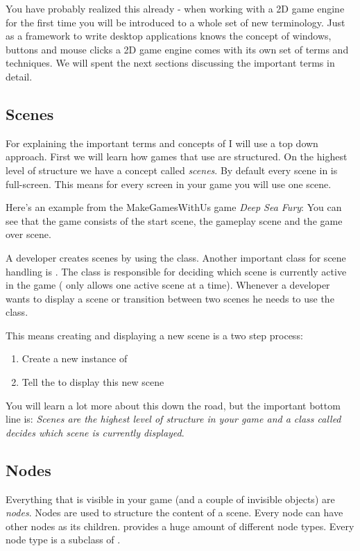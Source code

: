 You have probably realized this already - when working with a 2D game engine for
the first time you will be introduced to a whole set of new terminology. Just as a framework to write desktop
applications knows the concept of windows, buttons and mouse clicks a 2D game
engine comes with its own set of terms and techniques. We will spent the next
sections discussing the important terms in detail.

\subsection{Scenes}
For explaining the important terms and concepts of \cocos{} I will use a top
down approach. First we will learn how games that use \cocos{} are structured.
On the highest level of structure we have a concept called \textit{scenes}. By default every scene in
\cocos{} is full-screen. This means for every screen in your game you will use
one scene.

Here's an example from the MakeGamesWithUs game \textit{Deep Sea Fury}:
You can see that the game consists of the start scene, the gameplay scene and
the game over scene.

A \cocos{} developer creates scenes by using the \ccscene{} class. Another
important \cocos{} class for scene handling is \ccdirector{}. The \ccdirector{}
class is responsible for deciding which scene is currently active in the game
(\cocos{} only allows one active scene at a time). Whenever a developer wants to
display a scene or transition between two scenes he needs to use the
\ccdirector{} class.

This means creating and displaying a new scene is a two step process:
\begin{enumerate}
\item Create a new instance of \ccscene{}
\item Tell the \ccdirector{} to display this new scene
\end{enumerate}

You will learn a lot more about this down the road, but the important bottom
line is: \textit{Scenes are the highest level of structure in your game and a
class called \ccdirector{} decides which scene is currently displayed}.

\subsection{Nodes}
Everything that is visible in your \cocos{} game (and a couple of invisible
objects) are \textit{nodes}. Nodes are used to structure the content of a scene.
Every node can have other nodes as its children. \cocos{} provides a huge amount
of different node types. Every node type is a subclass of \ccnode{}.

